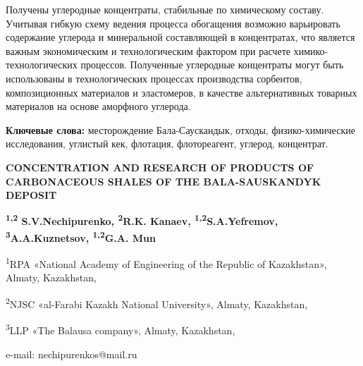Получены углеродные концентраты, стабильные по химическому составу.
Учитывая гибкую схему ведения процесса обогащения возможно варьировать
содержание углерода и минеральной составляющей в концентратах, что
является важным экономическим и технологическим фактором при расчете
химико-технологических процессов. Полученные углеродные концентраты
могут быть использованы в технологических процессах производства
сорбентов, композиционных материалов и эластомеров, в качестве
альтернативных товарных материалов на основе аморфного углерода.

{\bfseries Ключевые слова:} месторождение Бала-Саускандык, отходы,
физико-химические исследования, углистый кек, флотация, флотореагент,
углерод, концентрат.

\begin{center}
{\large\bfseries CONCENTRATION AND RESEARCH OF PRODUCTS OF CARBONACEOUS SHALES OF
THE BALA-SAUSKANDYK DEPOSIT}

{\bfseries \textsuperscript{1,2} S.V.Nechipurenko\envelope, \textsuperscript{2}R.K.
Kanaev, \textsuperscript{1,2}S.A.Yefremov,
\textsuperscript{3}A.A.Kuznetsov, \textsuperscript{1,2}G.A. Mun}

\textsuperscript{1}RPA «National Academy of Engineering of the Republic
of Kazakhstan», Almaty, Kazakhstan,

\textsuperscript{2}NJSC «al-Farabi Kazakh National University», Almaty,
Kazakhstan,

\textsuperscript{3}LLP «The Balausa company», Almaty, Kazakhstan,

e-mail: nechipurenkos@mail.ru
\end{center}

